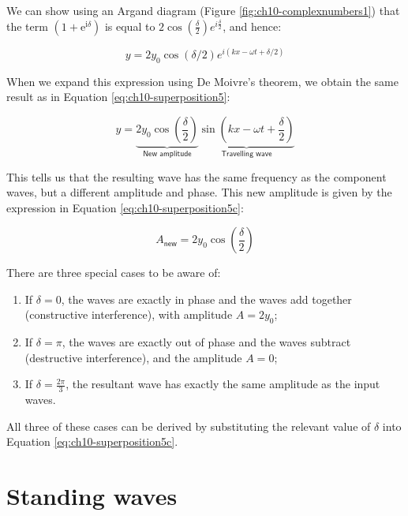 \documentclass[
]{book}
\providecommand{\tightlist}{%
  \setlength{\itemsep}{0pt}\setlength{\parskip}{0pt}}
\begin{document}
We can show using an Argand diagram (Figure \ref{fig:ch10-complexnumbers1}) that the term \((1 + \mathrm{e}^{\mathrm{i}\delta})\) is equal to \(2\cos \left(\frac{\delta}{2}\right)e^{i\frac{\delta}{2}}\), and hence:

\begin{equation}
y = 2y_0 \cos(\delta/2) e^{i(kx-\omega t + \delta/2)}
\end{equation}

When we expand this expression using De Moivre's theorem, we obtain the same result as in Equation \eqref{eq:ch10-superposition5}:

\begin{equation}
y = \underbrace{2 y_0 \cos \left( \frac{\delta}{2} \right)}_{\textsf{New amplitude}} \underbrace{\sin \left( kx - \omega t + \frac{\delta}{2} \right)}_{\textsf{Travelling wave}}
\label{eq:ch10-superposition5b} 
\end{equation}

This tells us that the resulting wave has the same frequency as the component waves, but a different amplitude and phase. This new amplitude is given by the expression in Equation \eqref{eq:ch10-superposition5c}:

\begin{equation}
A_{\textsf{new}} = 2 y_0 \cos \left( \frac{\delta}{2} \right)
\label{eq:ch10-superposition5c} 
\end{equation}

There are three special cases to be aware of:

\begin{enumerate}
\def\labelenumi{\arabic{enumi}.}
\tightlist
\item
  If \(\delta = 0\), the waves are exactly in phase and the waves add together (constructive interference), with amplitude \(A = 2 y_0\);
\item
  If \(\delta = \pi\), the waves are exactly out of phase and the waves subtract (destructive interference), and the amplitude \(A = 0\);
\item
  If \(\delta = \frac{2\pi}{3}\), the resultant wave has exactly the same amplitude as the input waves.
\end{enumerate}

All three of these cases can be derived by substituting the relevant value of \(\delta\) into Equation \eqref{eq:ch10-superposition5c}.

\hypertarget{sec:ch10-standingwaves1}{%
\section{Standing waves}\label{sec:ch10-standingwaves1}}
\end{document}
